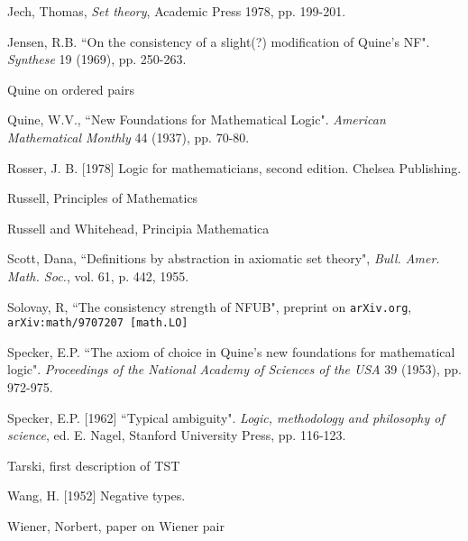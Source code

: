 \documentclass[112pt]{article}
\begin{document}
\begin{thebibliography}{99}
  Jech, Thomas, {\em Set theory}, Academic Press 1978, pp. 199-201.

  Jensen, R.B.
``On the consistency of a slight(?) modification of Quine's NF". 
{\em Synthese\/} 19 (1969), pp. 250-263.

  Quine on ordered pairs

  Quine, W.V.,
``New Foundations for Mathematical Logic". 
{\em American Mathematical Monthly\/} 44 (1937), pp. 70-80. 

  Rosser, J. B. [1978] 
Logic for mathematicians, second edition. 
Chelsea Publishing.

  Russell, Principles of Mathematics

  Russell and Whitehead, Principia Mathematica

  Scott, Dana, ``Definitions by abstraction in axiomatic set theory",  {\em Bull. Amer. Math.
Soc.}, vol. 61, p. 442, 1955.

  Solovay, R, ``The consistency strength of NFUB",  preprint on {\tt arXiv.org}, {\tt arXiv:math/9707207 [math.LO]}

  Specker, E.P.
``The axiom of choice in Quine's new foundations for mathematical logic". 
{\em Proceedings of the National Academy of Sciences of the USA\/} 39 (1953), pp. 972-975.

  Specker, E.P. [1962] 
``Typical ambiguity". 
{\em Logic, methodology and philosophy of science\/}, ed. E. Nagel, Stanford University Press, pp. 116-123.

  Tarski, first description of TST

  Wang, H. [1952] 
Negative types.

  Wiener, Norbert, paper on Wiener pair


\end{thebibliography}
\end{document}
